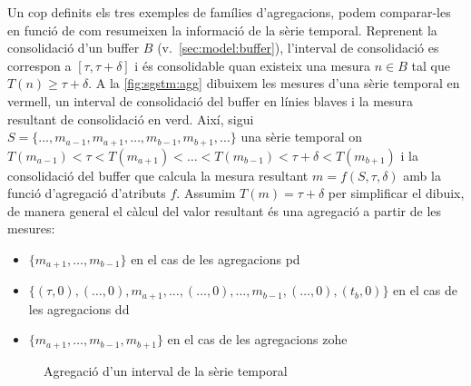 Un cop definits els tres exemples de famílies d'agregacions, podem
comparar-les en funció de com resumeixen la informació de la sèrie
temporal. Reprenent la consolidació d'un buffer $B$
(v.~\autoref{sec:model:buffer}), l'interval de consolidació es
correspon a $[\tau,\tau+\delta]$ i és consolidable quan
existeix una mesura $n\in B$ tal que $T(n)\geq\tau+\delta$. A la
\autoref{fig:sgstm:agg} dibuixem les mesures d'una sèrie temporal en
vermell, un interval de consolidació del buffer en línies blaves i la
mesura resultant de consolidació en verd.  Així, sigui
$S=\{\dotsc,m_{a-1},m_{a+1},\dotsc,m_{b-1},m_{b+1}, \ldots\}$ una
sèrie temporal on $ T(m_{a-1}) < \tau < T(m_{a+1}) < \dotsc <
T(m_{b-1}) < \tau+\delta < T(m_{b+1})$ i la consolidació del buffer que
calcula la mesura resultant $m=f(S,\tau,\delta)$ amb la funció
d'agregació d'atributs $f$.  Assumim $T(m)=\tau+\delta$ per simplificar el
dibuix, de manera general el càlcul del valor resultant és una
agregació a partir de les mesures:
\begin{itemize}
\item $\{m_{a+1},\dotsc,m_{b-1}\}$ en el cas de les agregacions \gls{pd}
\item $\{(\tau,0),(\ldots,0),m_{a+1},\dotsc,(\ldots,0),\dotsc,m_{b-1},(\ldots,0),(t_b,0)\}$ en el cas de les
  agregacions \gls{dd}
\item $\{m_{a+1},\dotsc,m_{b-1},m_{b+1}\}$ en el cas de les
  agregacions \gls{zohe}
\end{itemize}






\begin{figure}[tp]
  \centering
 

    
  \caption{Agregació d'un interval de la sèrie temporal}
  \label{fig:sgstm:agg}
\end{figure}






